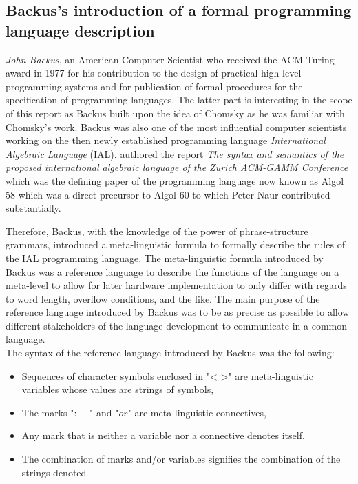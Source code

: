 \documentclass{article}
\begin{document}
\subsection{Backus's introduction of a formal programming language description}
\textit{John Backus}, an American Computer Scientist who received the ACM Turing award in 1977 for his contribution to the design of practical high-level programming systems and for publication of formal procedures for the specification of programming languages. The latter part is interesting in the scope of this report as Backus built upon the idea of Chomsky as he was familiar with Chomsky's work. Backus was also one of the most influential computer scientists working on the then newly established programming language \textit{International Algebraic Language} (IAL). \citet{Backus1959TheSA} authored the report \textit{The syntax and semantics of the proposed international algebraic language of the Zurich ACM-GAMM Conference} which was the defining paper of the programming language now known as Algol 58 which was a direct precursor to Algol 60 to which Peter Naur contributed substantially.

Therefore, Backus, with the knowledge of the power of phrase-structure grammars, introduced a meta-linguistic formula to formally describe the rules of the IAL programming language. The meta-linguistic formula introduced by Backus was a reference language to describe the functions of the language on a meta-level to allow for later hardware implementation to only differ with regards to word length, overflow conditions, and the like. The main purpose of the reference language introduced by Backus was to be as precise as possible to allow different stakeholders of the language development to communicate in a common language.
\\
The syntax of the reference language introduced by Backus was the following:
\begin{itemize}
	\item Sequences of character symbols enclosed in "< >" are meta-linguistic variables whose values are strings of symbols,
	\item The marks ":$\equiv$" and "$or$" are meta-linguistic connectives,
	\item Any mark that is neither a variable nor a connective denotes itself,
	\item The combination of marks and/or variables signifies the combination of the strings denoted
\end{itemize} 
\end{document}
